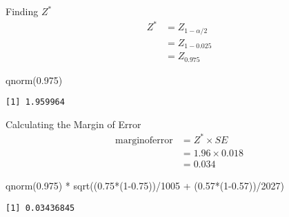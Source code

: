 \documentclass[
  ignorenonframetext,
]{beamer}
\newenvironment{Shaded}{\begin{snugshade}}{\end{snugshade}}
\newcommand{\DecValTok}[1]{\textcolor[rgb]{0.68,0.00,0.00}{#1}}
\newcommand{\FloatTok}[1]{\textcolor[rgb]{0.68,0.00,0.00}{#1}}
\newcommand{\FunctionTok}[1]{\textcolor[rgb]{0.28,0.35,0.67}{#1}}
\newcommand{\NormalTok}[1]{\textcolor[rgb]{0.00,0.23,0.31}{#1}}
\newcommand{\SpecialCharTok}[1]{\textcolor[rgb]{0.37,0.37,0.37}{#1}}
\begin{document}
\begin{frame}[fragile]{Finding \(Z^*\)}
\label{finding-z-1}
\[
\begin{aligned}
Z^*&=Z_{1-\alpha/2} \\
&=Z_{1-0.025} \\
&=Z_{0.975}
\end{aligned}
\]

\pause

\begin{Shaded}
\begin{Highlighting}[]
\FunctionTok{qnorm}\NormalTok{(}\FloatTok{0.975}\NormalTok{)}
\end{Highlighting}
\end{Shaded}

\begin{verbatim}
[1] 1.959964
\end{verbatim}
\end{frame}

\begin{frame}[fragile]{Calculating the Margin of Error}
\label{calculating-the-margin-of-error-1}
\[
\begin{aligned}
\operatorname{margin of error} &= Z^* \times SE \\
&= 1.96 \times 0.018 \\
&= 0.034
\end{aligned}
\]

\pause

\begin{Shaded}
\begin{Highlighting}[]
\FunctionTok{qnorm}\NormalTok{(}\FloatTok{0.975}\NormalTok{) }\SpecialCharTok{*} \FunctionTok{sqrt}\NormalTok{((}\FloatTok{0.75}\SpecialCharTok{*}\NormalTok{(}\DecValTok{1}\FloatTok{{-}0.75}\NormalTok{))}\SpecialCharTok{/}\DecValTok{1005} \SpecialCharTok{+}\NormalTok{ (}\FloatTok{0.57}\SpecialCharTok{*}\NormalTok{(}\DecValTok{1}\FloatTok{{-}0.57}\NormalTok{))}\SpecialCharTok{/}\DecValTok{2027}\NormalTok{)}
\end{Highlighting}
\end{Shaded}

\begin{verbatim}
[1] 0.03436845
\end{verbatim}
\end{frame}
\end{document}
